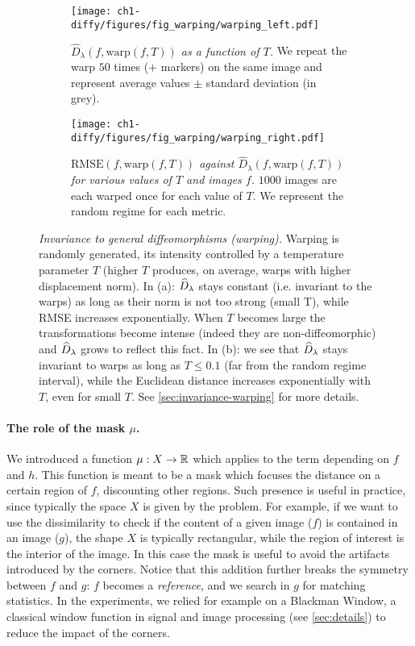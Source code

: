 \begin{figure*}
    \centering
    \begin{subfigure}[t]{0.45\textwidth}
        \texttt{[image: ch1-diffy/figures/fig\_warping/warping\_left.pdf]}
        \label{fig:warping-left}
        \caption{\emph{$\widehat D_\lambda(f, \text{warp}(f, T))$ as a function of $T$.} We repeat the warp $50$ times ($+$ markers) on the same image and represent average values $\pm$ standard deviation (in grey).}
    \end{subfigure}\qquad
    \begin{subfigure}[t]{0.45\textwidth}
        \texttt{[image: ch1-diffy/figures/fig\_warping/warping\_right.pdf]}
        \caption{\emph{$\textrm{RMSE}(f, \textrm{warp}(f, T))$ against $\widehat D_\lambda(f, \textrm{warp}(f, T))$ for various values of $T$ and images $f$.} $1000$ images are each warped once for each value of $T$. We represent the random regime for each metric.}
    \end{subfigure}
    \caption{\emph{Invariance to general diffeomorphisms (warping).} Warping is randomly generated, its intensity controlled by a temperature parameter $T$ (higher $T$ produces, on average, warps with higher displacement norm). In (a): $\widehat D_\lambda$ stays constant (i.e. invariant to the warps) as long as their norm is not too strong (small T), while RMSE increases exponentially. When $T$ becomes large the transformations become intense (indeed they are non-diffeomorphic) and $\widehat D_\lambda$ grows to reflect this fact.  In (b): we see that $\widehat D_\lambda$ stays invariant to warps as long as $T \leq 0.1$ (far from the random regime interval), while the Euclidean distance increases exponentially with $T$, even for small $T$. See \cref{sec:invariance-warping} for more details.}
    \label{fig:warping}
\end{figure*}


\paragraph{The role of the mask $\mu$.} We introduced a function $\mu:X \to \mathbb R$ which applies to the term depending on $f$ and $h$. This function is meant to be a mask which focuses the distance on a certain region of $f$, discounting other regions. Such presence is useful in practice, since typically the space $X$ is given by the problem. For example, if we want to use the dissimilarity to check if the content of a given image ($f$) is contained in an image ($g$), the shape $X$ is typically rectangular, while the region of interest is the interior of the image. In this case the mask is useful to avoid the artifacts introduced by the corners. Notice that this addition further breaks the symmetry between $f$ and $g$: $f$ becomes a \emph{reference}, and we search in $g$ for matching statistics. In the experiments, we relied for example on a Blackman Window, a classical window function in signal and image processing (see \cref{sec:details}) to reduce the impact of the corners.



